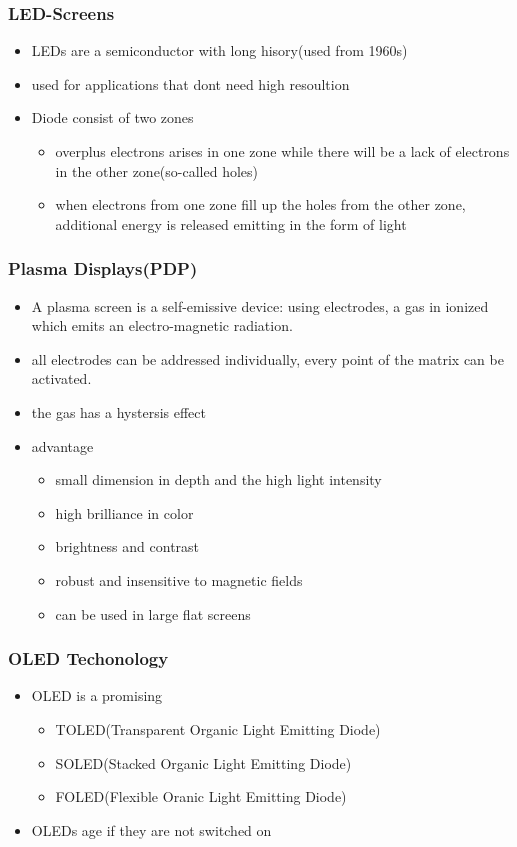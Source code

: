 \documentclass{standalone}
\begin{document}
\subsubsection*{LED-Screens}
\begin{itemize}
\item LEDs are a semiconductor with long hisory(used from 1960s)
\item used for applications that dont need high resoultion
\item Diode consist of two zones
\begin{itemize}
\item overplus electrons arises in one zone while there will be a lack of electrons in the other zone(so-called holes)
\item when electrons from one zone fill up the holes from the other zone, additional energy is released emitting in the form of light
\end{itemize}
\end{itemize}
\subsubsection*{Plasma Displays(PDP)}
\begin{itemize}
\item A plasma screen is a self-emissive device: using electrodes, a gas in ionized which emits an electro-magnetic radiation.
\item all electrodes can be addressed individually, every point of the matrix can be activated.
\item the gas has a hystersis effect
\item advantage
\begin{itemize}
\item small dimension in depth and the high light intensity
\item high brilliance in color
\item brightness and contrast
\item robust and insensitive to magnetic fields
\item can be used in large flat screens
\end{itemize} 
\end{itemize}
\subsubsection*{OLED Techonology}
\begin{itemize}
\item OLED is a promising
\begin{itemize}
\item TOLED(Transparent Organic Light Emitting Diode)
\item SOLED(Stacked Organic Light Emitting Diode)
\item FOLED(Flexible Oranic Light Emitting Diode)
\end{itemize}
\item OLEDs age if they are not switched on
\end{itemize}
\end{document}
